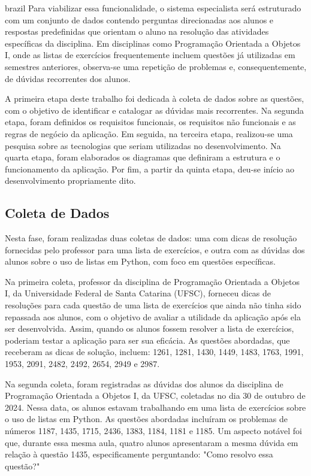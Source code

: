 \begin{otherlanguage*}{brazil}
Para viabilizar essa funcionalidade, o sistema especialista será estruturado com um conjunto de dados contendo perguntas direcionadas aos alunos e respostas predefinidas que orientam o aluno na resolução das atividades específicas da disciplina. Em disciplinas como Programação Orientada a Objetos I, onde as listas de exercícios frequentemente incluem questões já utilizadas em semestres anteriores, observa-se uma repetição de problemas e, consequentemente, de dúvidas recorrentes dos alunos.

A primeira etapa deste trabalho foi dedicada à coleta de dados sobre as questões, com o objetivo de identificar e catalogar as dúvidas mais recorrentes. Na segunda etapa, foram definidos os requisitos funcionais, os requisitos não funcionais e as regras de negócio da aplicação. Em seguida, na terceira etapa, realizou-se uma pesquisa sobre as tecnologias que seriam utilizadas no desenvolvimento. Na quarta etapa, foram elaborados os diagramas que definiram a estrutura e o funcionamento da aplicação. Por fim, a partir da quinta etapa, deu-se início ao desenvolvimento propriamente dito.

\subsection{Coleta de Dados}
\label{sec:coleta-dados}

Nesta fase, foram realizadas duas coletas de dados: uma com dicas de resolução fornecidas pelo professor para uma lista de exercícios, e outra com as dúvidas dos alunos sobre o uso de listas em Python, com foco em questões específicas.

Na primeira coleta, professor da disciplina de Programação Orientada a Objetos I, da Universidade Federal de Santa Catarina (UFSC), forneceu dicas de resoluções para cada questão de uma lista de exercícios que ainda não tinha sido repassada aos alunos, com o objetivo de avaliar a utilidade da aplicação após ela ser desenvolvida. Assim, quando os alunos fossem resolver a lista de exercícios, poderiam testar a aplicação para ser sua eficácia. As questões abordadas, que receberam as dicas de solução, incluem: 1261, 1281, 1430, 1449, 1483, 1763, 1991, 1953, 2091, 2482, 2492, 2654, 2949 e 2987.

Na segunda coleta, foram registradas as dúvidas dos alunos da disciplina de Programação Orientada a Objetos I, da UFSC, coletadas no dia 30 de outubro de 2024. Nessa data, os alunos estavam trabalhando em uma lista de exercícios sobre o uso de listas em Python. As questões abordadas incluíram os problemas de números 1187, 1435, 1715, 2436, 1383, 1184, 1181 e 1185. Um aspecto notável foi que, durante essa mesma aula, quatro alunos apresentaram a mesma dúvida em relação à questão 1435, especificamente perguntando: "Como resolvo essa questão?"


\end{otherlanguage*}
